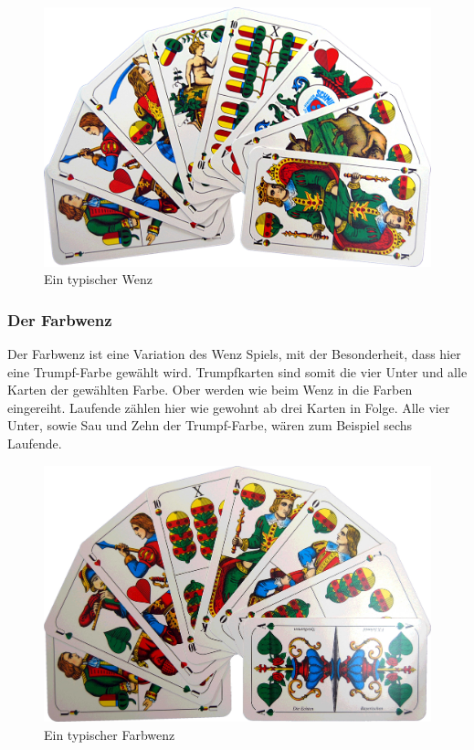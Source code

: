 \documentclass[
							a4paper, 
							11pt, 
							openany, 
							liststotoc,
							parskip=half, 
   							headings=normal
						]{scrreprt}
\begin{document}
{\begin{figure}[H]
\begin{center}
    \includegraphics[width=1.0\textwidth]{./pictures/cards/wenz.jpg}
	\caption[Schafkopf -- Ein typischer Wenz]{Ein typischer Wenz} \label{fig:schafkopf_karten_wenz}
\end{center}
\end{figure}

\clearpage

\subsubsection{Der Farbwenz} \label{ssse:grundlagen_schafkopf_regeln_farbwenz}
Der Farbwenz ist eine Variation des Wenz Spiels, mit der Besonderheit, dass hier eine Trumpf-Farbe gewählt wird. Trumpfkarten sind somit die vier Unter und alle Karten der gewählten Farbe. Ober werden wie beim Wenz in die Farben eingereiht. Laufende zählen hier wie gewohnt ab drei Karten in Folge. Alle vier Unter, sowie Sau und Zehn der Trumpf-Farbe, wären zum Beispiel sechs Laufende. \cite[S.78]{merschbacher:schafkopf}


\begin{figure}[H]
\begin{center}
    \includegraphics[width=1.0\textwidth]{./pictures/cards/farbwenz.jpg}
	\caption[Schafkopf -- Ein typischer Farbwenz]{Ein typischer Farbwenz} \label{fig:schafkopf_karten_farbwenz}
\end{center}
\end{figure}

}
\end{document}
